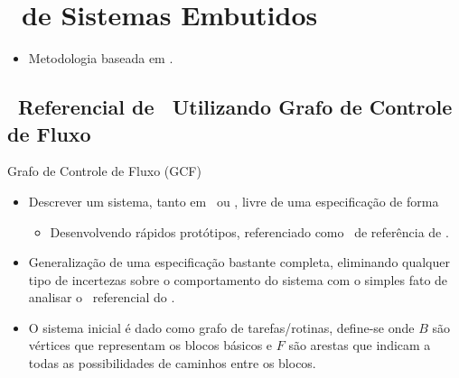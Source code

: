 \section{\Design\ de Sistemas Embutidos}

   \begin{frame}
      \begin{itemize}
         \item Metodologia baseada em \parencite{Sass2010, Arato2003, Arato2005, Mann2007, Hassine2017}.
      \end{itemize}
   \end{frame}

   \subsection{\Design\ Referencial de \Software\ Utilizando Grafo de Controle de Fluxo}

   \begin{frame}{Grafo de Controle de Fluxo (GCF)} \vspace{-1em}
      \begin{itemize}
         \setlength{\itemsep}{1.2em}
         \item Descrever um sistema, tanto em \software\ ou \hardware, livre de uma especificação de forma
         \begin{itemize}
            \item Desenvolvendo rápidos protótipos, referenciado como \design\ de referência de \software.
         \end{itemize}

         \item Generalização de uma especificação bastante completa, eliminando qualquer tipo de incertezas sobre o comportamento do sistema com o simples fato de analisar o \design\ referencial do \software.

         \item O sistema inicial é dado como grafo de tarefas/rotinas, define-se  onde $B$ são vértices que representam os blocos básicos e $F$ são arestas que indicam a todas as possibilidades de caminhos entre os blocos.

      \end{itemize}
   \end{frame}

